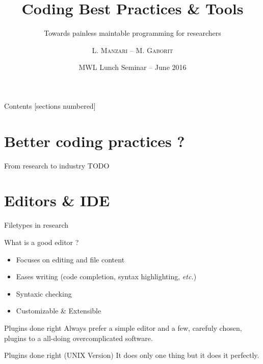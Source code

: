 \documentclass[10pt]{beamer}
\title{Coding Best Practices \& Tools}
\subtitle{Towards painless maintable programming for researchers}
\date{MWL Lunch Seminar -- June 2016}
\author{L. \textsc{Manzari} -- M. \textsc{Gaborit}}
\institute{}
\newcommand\fileimage[1]{%
	\draw[fill=black!2] (#1) -- ++(2,0) -- ++(0,2.5) -- ++(-1.5,0) -- ++(-.5,-.5) -- cycle;
}
\begin{document}
\maketitle

\begin{frame}{Contents}
	[sections numbered]
	\tableofcontents[hideallsubsections]
\end{frame}

\section{Better coding practices ?} %

\begin{frame}{From research to industry}
	TODO
\end{frame}

\section{Editors \& IDE} %

\begin{frame}{Filetypes in research} %

	\begin{center}
		\pause{}


	\end{center}
\end{frame}

\begin{frame}{What is a good editor ?} %
	\begin{itemize}
		\item Focuses on editing and file content
		\item Eases writing (code completion, syntax highlighting, \textit{etc.})
		\item Syntaxic checking
		\item Customizable \& Extensible
	\end{itemize}

	\pause{}
	\begin{block}{Plugins done right} %
		Always prefer a simple editor and a few, carefuly chosen, plugins to a all-doing
		overcomplicated software.
	\end{block}

	\pause
	\begin{block}{Plugins done right (UNIX Version)}
		It does only one thing but it does it perfectly.
	\end{block}
\end{frame}
\end{document}
